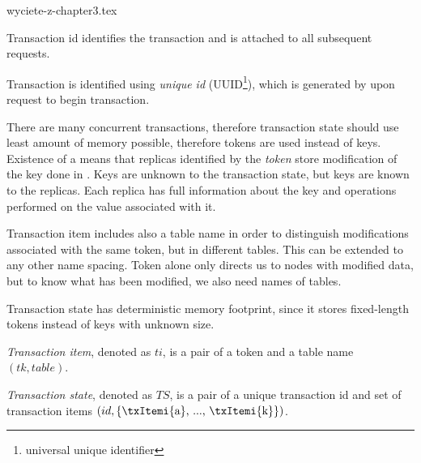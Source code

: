 wyciete-z-chapter3.tex

Transaction id identifies the transaction and is attached to all subsequent requests. 

Transaction \transaction is identified using \emph{unique id} (UUID\footnote{universal unique identifier}), which is generated by  upon request to begin transaction. 

There are many concurrent transactions, therefore transaction state should use least amount of memory possible, therefore tokens are used instead of keys. Existence of a \txItem means that replicas identified by the \emph{token} store modification of the key done in \transaction. Keys are unknown to the transaction state, but keys are known to the replicas. Each replica has full information about the key and operations performed on the value associated with it. 

Transaction item includes also a table name in order to distinguish modifications associated with the same token, but in different tables. This can be extended to any other name spacing.
Token alone only directs us to nodes with modified data, but to know what has been modified, we also need names of tables. 

Transaction state has deterministic memory footprint, since it stores fixed-length tokens instead of keys with unknown size. 

\begin{definition}
  \label{def:transactionItem}
  \emph{Transaction item}, denoted as $ti$, is a pair of a token and a table name $(tk,table)$.
\end{definition}

\begin{definition}
  \label{def:transactionState}
  \emph{Transaction state}, denoted as $TS$, is a pair of a unique transaction id and set of transaction items $(id, \{ \text{\txItemi{a}, ..., \txItemi{k}} \})$.
\end{definition}
